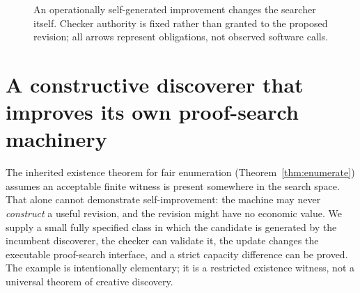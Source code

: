 \documentclass[11pt,letterpaper]{article}
\theoremstyle{definition}
\theoremstyle{remark}
\begin{document}
\begin{figure}[htbp]\centering
{}
\caption{An operationally self-generated improvement changes the searcher itself. Checker authority is fixed rather than granted to the proposed revision; all arrows represent obligations, not observed software calls.}
\end{figure}

\section{A constructive discoverer that improves its own proof-search machinery}\label{sec:ladder}
The inherited existence theorem for fair enumeration (Theorem~\ref{thm:enumerate}) assumes an acceptable finite witness is present somewhere in the search space. That alone cannot demonstrate self-improvement: the machine may never \emph{construct} a useful revision, and the revision might have no economic value. We supply a small fully specified class in which the candidate is generated by the incumbent discoverer, the checker can validate it, the update changes the executable proof-search interface, and a strict capacity difference can be proved. The example is intentionally elementary; it is a restricted existence witness, not a universal theorem of creative discovery.
\end{document}
